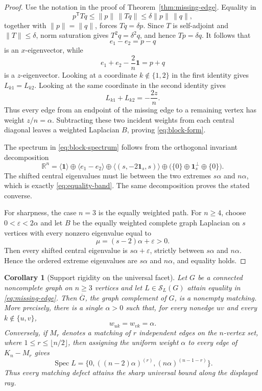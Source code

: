 \documentclass[11pt,reqno]{amsart}
\newtheorem{corollary}[theorem]{Corollary}
\theoremstyle{definition}
\theoremstyle{remark}
\newcommand{\one}{\mathbf 1}
\newcommand{\R}{\mathbb R}
\newcommand{\SL}{\mathcal S_L}
\newcommand{\Spec}{\operatorname{Spec}}
\begin{document}
\begin{proof}
Use the notation in the proof of Theorem~\ref{thm:missing-edge}.  Equality in
\[
  p^{\mathsf T}Tq
  \le \|p\|\,\|Tq\|
  \le \delta\|p\|\,\|q\|,
\]
together with $\|p\|=\|q\|$, forces $Tq=\delta p$.  Since $T$ is
self-adjoint and $\|T\|\le\delta$, norm saturation gives
$T^2q=\delta^2q$, and hence $Tp=\delta q$.
It follows that
\[
  e_1-e_2=p-q
\]
is an $x$-eigenvector, while
\[
  e_1+e_2-\frac2n\one=p+q
\]
is a $z$-eigenvector.  Looking at a coordinate $k\notin\{1,2\}$ in the first
identity gives $L_{k1}=L_{k2}$.  Looking at the same coordinate in the second
identity gives
\[
  L_{k1}+L_{k2}=-\frac{2z}{n}.
\]
Thus every edge from an endpoint of the missing edge to a remaining vertex
has weight $z/n=\alpha$.  Subtracting these two incident weights from each
central diagonal leaves a weighted Laplacian $B$, proving
\eqref{eq:block-form}.

The spectrum in \eqref{eq:block-spectrum} follows from the orthogonal
invariant decomposition
\[
 \R^n
 =\langle\one\rangle
 \oplus\langle e_1-e_2\rangle
 \oplus\langle(s,-2\one_s,s)\rangle
 \oplus\bigl(\{0\}\oplus\one_s^\perp\oplus\{0\}\bigr).
\]
The shifted central eigenvalues must lie between the two extremes
$s\alpha$ and $n\alpha$, which is exactly \eqref{eq:equality-band}.
The same decomposition proves the stated converse.

For sharpness, the case $n=3$ is the equally weighted path.  For $n\ge4$,
choose $0<\varepsilon<2\alpha$ and let $B$ be the equally weighted complete
graph Laplacian on $s$ vertices with every nonzero eigenvalue equal to
\[
  \mu=(s-2)\alpha+\varepsilon>0.
\]
Then every shifted central eigenvalue is $s\alpha+\varepsilon$, strictly
between $s\alpha$ and $n\alpha$.  Hence the ordered extreme eigenvalues are
$s\alpha$ and $n\alpha$, and equality holds.
\end{proof}

\begin{corollary}[Support rigidity on the universal facet]
\label{cor:matching-complement}
Let $G$ be a connected noncomplete graph on $n\ge3$ vertices and let
$L\in\SL(G)$ attain equality in \eqref{eq:missing-edge}.  Then
$\overline G$, the graph complement of $G$, is a nonempty matching.  More
precisely, there is a single
$\alpha>0$ such that, for every nonedge $uv$ and every
$k\notin\{u,v\}$,
\[
  w_{uk}=w_{vk}=\alpha.
\]
Conversely, if $M_r$ denotes a matching of $r$ independent edges on the
$n$-vertex set, where $1\le r\le\lfloor n/2\rfloor$, then assigning the
uniform weight $\alpha$ to every edge of $K_n-M_r$ gives
\begin{equation}\label{eq:matching-facet-spectrum}
  \Spec L=\{0,((n-2)\alpha)^{(r)},
                    (n\alpha)^{(n-1-r)}\}.
\end{equation}
Thus every matching defect attains the sharp universal bound along the
displayed ray.
\end{corollary}
\end{document}
